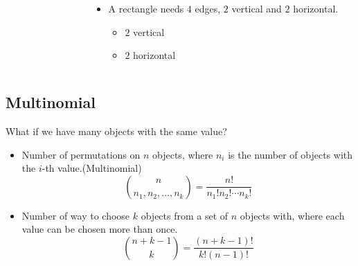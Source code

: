 \documentclass[12pt,t]{beamer}
\newcommand{\bi}{\begin{itemize}}
\newcommand{\ei}{\end{itemize}}
\begin{document}
\begin{frame}
\begin{columns}
\begin{column}{.3\textwidth}
{\begin{figure}
\begin{tabular}{|c|c!{\color{hilight}\vrule}c|c|c!{\color{hilight}\vrule}c|}
          & & & & & \\ \hline
        \end{tabular}
      \end{figure}}
    \end{column}
    \begin{column}{0.8\textwidth}
      \bi
        \item A rectangle needs $4$ edges, $2$ vertical and $2$ horizontal.
          \bi
            \item $2$ vertical
            \item $2$ horizontal
          \ei
      \ei
    \end{column}
  \end{columns}
\end{frame}

\subsection{Multinomial}
\begin{frame}
  \vspace{20pt}
  What if we have many objects with the same value?
  \bi
    \item Number of permutations on $n$ objects, where $n_i$ is the number of
      objects with the $i$-th value.(Multinomial)
      \[
        \binom{n}{n_1,n_2,\ldots,n_k} = \frac{n!}{n_1!n_2!\cdots n_k!}
      \]
    \item Number of way to choose $k$ objects from a set of $n$ objects with, where each value can be chosen more than once.
      \[
        \binom{n + k - 1}{k} = \frac{(n + k - 1)!}{k!(n-1)!}
      \]
  \ei
\end{frame}
\end{document}
